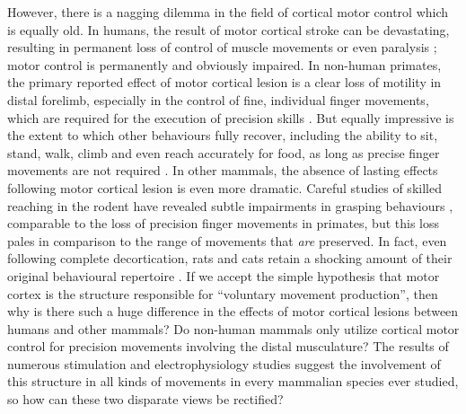 However, there is a nagging dilemma in the field of cortical motor control which is equally old. In humans, the result of motor cortical stroke can be devastating, resulting in permanent loss of control of muscle movements or even paralysis \cite{Laplane1977}; motor control is permanently and obviously impaired. In non-human primates, the primary reported effect of motor cortical lesion is a clear loss of motility in distal forelimb, especially in the control of fine, individual finger movements, which are required for the execution of precision skills \cite{Leyton1917,Darling2011}. But equally impressive is the extent to which other behaviours fully recover, including the ability to sit, stand, walk, climb and even reach accurately for food, as long as precise finger movements are not required \cite{Leyton1917,Darling2011,Zaaimi2012}. In other mammals, the absence of lasting effects following motor cortical lesion is even more dramatic. Careful studies of skilled reaching in the rodent have revealed subtle impairments in grasping behaviours \cite{Alaverdashvili2008a}, comparable to the loss of precision finger movements in primates, but this loss pales in comparison to the range of movements that \emph{are} preserved. In fact, even following complete decortication, rats and cats retain a shocking amount of their original behavioural repertoire \cite{Bjursten1976,Terry1989}. If we accept the simple hypothesis that motor cortex is the structure responsible for ``voluntary movement production'', then why is there such a huge difference in the effects of motor cortical lesions between humans and other mammals? Do non-human mammals only utilize cortical motor control for precision movements involving the distal musculature? The results of numerous stimulation and electrophysiology studies suggest the involvement of this structure in all kinds of movements in every mammalian species ever studied, so how can these two disparate views be rectified?

